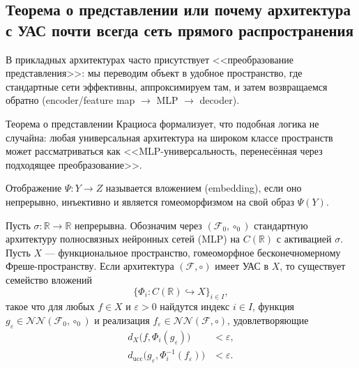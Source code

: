 \documentclass[../NDCNNAI_main.tex]{subfiles}
\begin{document}
\subsection{Теорема о представлении или почему архитектура с УАС почти всегда сеть прямого распространения}
В прикладных архитектурах часто присутствует <<преобразование представления>>: мы переводим объект в удобное пространство,
где стандартные сети эффективны, аппроксимируем там, и затем возвращаемся обратно (encoder/feature map $\to$ MLP $\to$ decoder).

Теорема о представлении Крациоса формализует, что подобная логика не случайна: любая универсальная архитектура
на широком классе пространств может рассматриваться как <<MLP-универсальность, перенесённая через подходящее преобразование>>.
\begin{definition}\label{def:embedding_repr_style}
Отображение $\Psi:Y\to Z$ называется вложением (embedding), если оно непрерывно, инъективно и является
гомеоморфизмом на свой образ $\Psi(Y)$.
\end{definition}

\begin{theorem}
Пусть $\sigma\colon\mathbb{R}\to\mathbb{R}$ непрерывна.
Обозначим через $(\mathcal{F}_0,\circ_0)$ стандартную архитектуру полносвязных нейронных сетей (MLP)
на $C(\mathbb{R})$ с активацией $\sigma$.
Пусть $X$ --- функциональное пространство, гомеоморфное бесконечномерному Фреше-пространству.
Если архитектура $(\mathcal{F},\circ)$ имеет УАС в $X$, то существует семейство вложений
\[
\{\Phi_i\colon C(\mathbb{R})\hookrightarrow X\}_{i\in I},
\]
такое что для любых $f\in X$ и $\varepsilon>0$ найдутся индекс $i\in I$, функция
$g_\varepsilon\in \mathcal{NN}(\mathcal{F}_0,\circ_0)$ и реализация
$f_\varepsilon\in \mathcal{NN}(\mathcal{F},\circ)$, удовлетворяющие
\begin{align}
d_X\bigl(f,\Phi_i(g_\varepsilon)\bigr) &< \varepsilon, \label{eq:repr_push_style}\\
d_{\mathrm{ucc}}\bigl(g_\varepsilon,\Phi_i^{-1}(f_\varepsilon)\bigr) &< \varepsilon. \label{eq:repr_pull_style}
\end{align}
\end{theorem}
\end{document}
